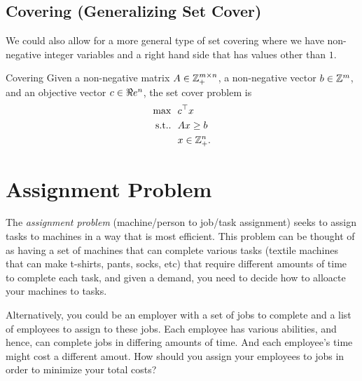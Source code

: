\subsection{Covering (Generalizing Set Cover)}
We could also allow for a more general type of set covering where we have non-negative integer variables and a right hand side that has values other than $1$.
\begin{general}{Covering}{\npcomplete}
\label{general:covering}
Given a non-negative matrix $A \in {\mathbb{Z}}_+^{m \times n}$, a non-negative vector $b \in {\mathbb{Z}}^m$, and an objective vector $c \in \Re e^n$, the set cover problem is
\begin{equation}
\begin{split}
\max \ \ & c^\top x\\
\mbox{s.t.}. \ \ & Ax \geq b \\
& x \in{\mathbb{Z}}^n_+.
\end{split}
\end{equation}
\end{general}

%
%




\section{Assignment Problem}

The \emph{assignment problem} (machine/person to job/task assignment) seeks to assign tasks to machines in a way that is most efficient.   This problem can be thought of as having a set of machines that can complete various tasks (textile machines that can make t-shirts, pants, socks, etc) that require different amounts of time to complete each task, and given a demand, you need to decide how to alloacte your machines to tasks.

Alternatively, you could be an employer with a set of jobs to complete and a list of employees to assign to these jobs.  Each employee has various abilities, and hence, can complete jobs in differing amounts of time.  And each employee's time might cost a different amout.  How should you assign your employees to jobs in order to minimize your total costs?


